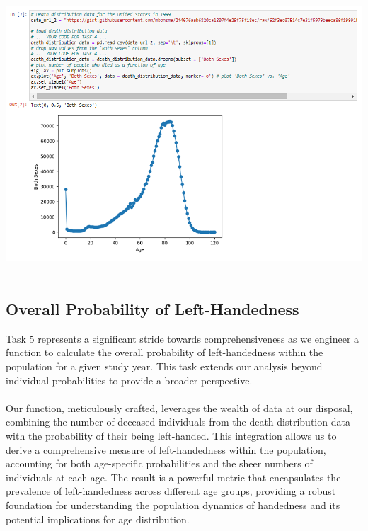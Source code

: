 \documentclass{article}
\begin{document}
\vspace{0.8cm}
        \begin{center}
            \includegraphics[height=300pt]{4.png}\\
        \end{center}
    \vspace{0.5cm}

\subsection{Overall Probability of Left-Handedness}

Task 5 represents a significant stride towards comprehensiveness as we engineer a function to calculate the overall probability of left-handedness within the population for a given study year. This task extends our analysis beyond individual probabilities to provide a broader perspective.\\ \\ Our function, meticulously crafted, leverages the wealth of data at our disposal, combining the number of deceased individuals from the death distribution data with the probability of their being left-handed. This integration allows us to derive a comprehensive measure of left-handedness within the population, accounting for both age-specific probabilities and the sheer numbers of individuals at each age. The result is a powerful metric that encapsulates the prevalence of left-handedness across different age groups, providing a robust foundation for understanding the population dynamics of handedness and its potential implications for age distribution.
\end{document}
